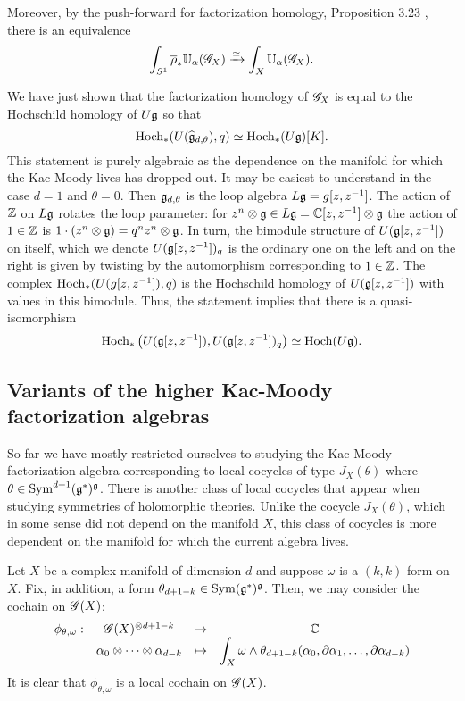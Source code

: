 \documentclass[10pt]{amsart}
\begin{document}
Moreover, by the push-forward for factorization homology, Proposition 3.23 \cite{AFTopMan}, there is an equivalence
\[
\int_{S^1} \overline{\rho}_* \mathbb U_\alpha(\mathscr G_X) \xrightarrow{\simeq} \int_X \mathbb U_{\alpha} (\mathscr G_X) .
\]

We have just shown that the factorization homology of $\mathscr G_X$ is equal to the Hochschild homology of $U\mathfrak g$ so that
\[
{\rm Hoch}_*(U(\widehat{\mathfrak g}_{d,\theta}), q) \simeq {\rm Hoch}_* (U\mathfrak g)[K] .
\]
This statement is purely algebraic as the dependence on the manifold for which the Kac-Moody lives has dropped out.
It may be easiest to understand in the case $d=1$ and $\theta = 0$. 
Then $\mathfrak g_{d,\theta}$ is the loop algebra $L\mathfrak g = g [z,z^{-1}]$. 
The action of $\mathbb Z$ on $L\mathfrak g$ rotates the loop parameter: for $z^n \otimes \mathfrak g \in L \mathfrak g = \mathbb C[z,z^{-1}] \otimes \mathfrak g$ the action of $1 \in \mathbb Z$ is $1 \cdot (z^n \otimes \mathfrak g) = q^n z^n \otimes \mathfrak g$. 
In turn, the bimodule structure of $U(\mathfrak g[z,z^{-1}])$ on itself, which we denote $U(\mathfrak g[z,z^{-1}])_q$ is the ordinary one on the left and on the right is given by twisting by the automorphism corresponding to $1 \in \mathbb Z$. 
The complex ${\rm Hoch}_*(U(g[z,z^{-1}]), q)$ is the Hochschild homology of $U(\mathfrak g[z,z^{-1}])$ with values in this bimodule.
Thus, the statement implies that there is a quasi-isomorphism
\[
{\rm Hoch}_*\left(U(\mathfrak g[z,z^{-1}]), U(\mathfrak g[z,z^{-1}])_q \right) \simeq {\rm Hoch}(U \mathfrak g) . 
\]

\subsection{Variants of the higher Kac-Moody factorization algebras}

So far we have mostly restricted ourselves to studying the Kac-Moody factorization algebra corresponding to local cocycles of type $J_X(\theta)$ where $\theta \in {\rm Sym}^{d+1}(\mathfrak g^*)^\mathfrak g$.
There is another class of local cocycles that appear when studying symmetries of holomorphic theories. 
Unlike the cocycle $J_X(\theta)$, which in some sense did not depend on the manifold $X$, this class of cocycles is more dependent on the manifold for which the current algebra lives.

Let $X$ be a complex manifold of dimension $d$ and suppose $\omega$ is a $(k,k)$ form on $X$. 
Fix, in addition, a form $\theta_{d+1-k} \in {\rm Sym}(\mathfrak g^*)^\mathfrak g$.
Then, we may consider the cochain on $\mathscr G(X)$:
\[
\begin{array}{cccc}
\displaystyle \phi_{\theta, \omega} : & \mathscr G(X)^{\otimes d + 1 - k} & \to & \mathbb C \\
\displaystyle & \alpha_0 \otimes\cdots \otimes \alpha_{d-k} & \mapsto & \displaystyle \int_X \omega \wedge \theta_{d+1-k}(\alpha_0, \partial\alpha_1,\ldots,\partial \alpha_{d-k})
\end{array}
\]
It is clear that $\phi_{\theta,\omega}$ is a local cochain on $\mathscr G(X)$. 
\end{document}
